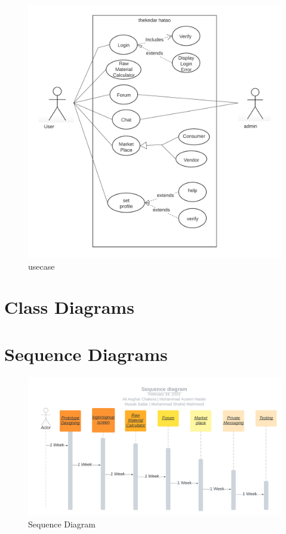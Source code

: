 \documentclass{article}
\begin{document}
\begin{figure}[!h]
    \begin{center}  
        \includegraphics[width=1\linewidth]{usecase.png}
        \caption{usecase}
        \label{fig:UML}
    \end{center}
\end{figure}

\newpage

\section*{Class Diagrams}

\section*{Sequence Diagrams}
\centering
\begin{figure}[!h]
    \includegraphics[width=1\linewidth]{Sequence diagram.png}
    \caption{Sequence Diagram}
    \label{fig:seq}
\end{figure}
\end{document}
